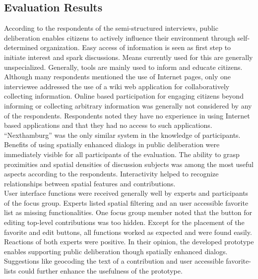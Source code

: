\subsection{Evaluation Results}
\label{sub:evaluation-results}
According to the respondents of the semi-structured interviews, public deliberation enables citizens to actively influence their environment through self-determined organization. Easy access of information is seen as first step to initiate interest and spark discussions. Means currently used for this are generally unspecialized. Generally, tools are mainly used to inform and educate citizens. Although many respondents mentioned the use of Internet pages, only one interviewee addressed the use of a wiki web application for collaboratively collecting information. Online based participation for engaging citizens beyond informing or collecting arbitrary information was generally not considered by any of the respondents. Respondents noted they have no experience in using Internet based applications and that they had no access to such applications. ``Nexthamburg'' was the only similar system in the knowledge of participants.\\
Benefits of using spatially enhanced dialogs in public deliberation were immediately visible for all participants of the evaluation. The ability to grasp proximities and spatial densities of discussion subjects was among the most useful aspects according to the respondents. Interactivity helped to recognize relationships between spatial features and contributions.\\
User interface functions were received generally well by experts and participants of the focus group. Experts listed spatial filtering and an user accessible favorite list as missing functionalities. One focus group member noted that the button for editing top-level contributions was too hidden. Except for the placement of the favorite and edit buttons, all functions worked as expected and were found easily. Reactions of both experts were positive. In their opinion, the developed prototype enables supporting public deliberation though spatially enhanced dialogs. Suggestions like geocoding the text of a contribution and user accessible favorite-lists could further enhance the usefulness of the prototype.\\%
